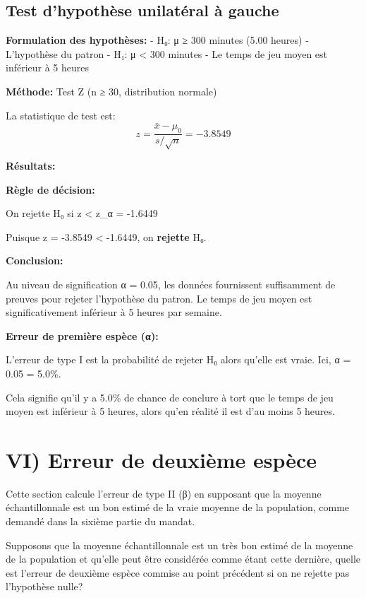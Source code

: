 \documentclass[11pt]{article}
\newcommand{\prompt}[4]{
        {\ttfamily\llap{{\color{#2}[#3]:\hspace{3pt}#4}}\vspace{-\baselineskip}}
    }
\begin{document}
            
\prompt{Out}{outcolor}{32}{}
    
    \subsection{Test d'hypothèse unilatéral à
gauche}\label{test-dhypothuxe8se-unilatuxe9ral-uxe0-gauche}

\textbf{Formulation des hypothèses:} - H₀: μ ≥ 300 minutes (5.00 heures)
- L'hypothèse du patron - H₁: μ \textless{} 300 minutes - Le temps de
jeu moyen est inférieur à 5 heures

\textbf{Méthode:} Test Z (n ≥ 30, distribution normale)

La statistique de test est: \[
z = \frac{\bar{x} - \mu_0}{s / \sqrt{n}} = -3.8549
\]

\textbf{Résultats:}

\textbf{Règle de décision:}

On rejette H₀ si z \textless{} z\_α = -1.6449

Puisque z = -3.8549 \textless{} -1.6449, on \textbf{rejette} H₀.

\textbf{Conclusion:}

Au niveau de signification α = 0.05, les données fournissent
suffisamment de preuves pour rejeter l'hypothèse du patron. Le temps de
jeu moyen est significativement inférieur à 5 heures par semaine.

\textbf{Erreur de première espèce (α):}

L'erreur de type I est la probabilité de rejeter H₀ alors qu'elle est
vraie. Ici, α = 0.05 = 5.0\%.

Cela signifie qu'il y a 5.0\% de chance de conclure à tort que le temps
de jeu moyen est inférieur à 5 heures, alors qu'en réalité il est d'au
moins 5 heures.

    

    \section{VI) Erreur de deuxième
espèce}\label{vi-erreur-de-deuxiuxe8me-espuxe8ce}

Cette section calcule l'erreur de type II (β) en supposant que la
moyenne échantillonnale est un bon estimé de la vraie moyenne de la
population, comme demandé dans la sixième partie du mandat.

Supposons que la moyenne échantillonnale est un très bon estimé de la
moyenne de la population et qu'elle peut être considérée comme étant
cette dernière, quelle est l'erreur de deuxième espèce commise au point
précédent si on ne rejette pas l'hypothèse nulle?
\end{document}
